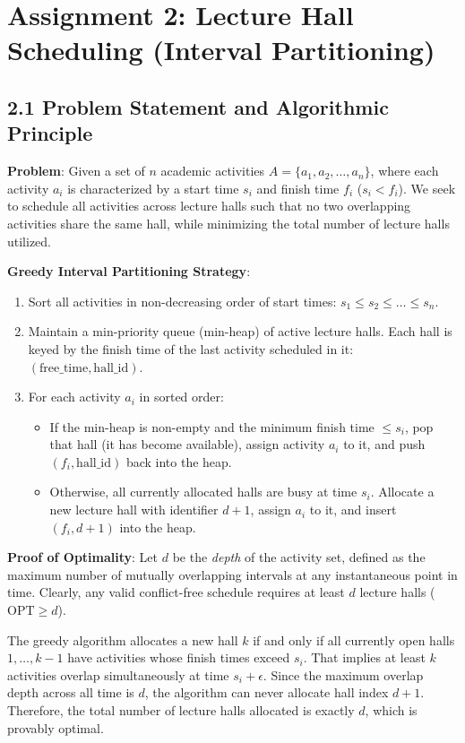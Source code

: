 \documentclass[12pt]{article}
\begin{document}
\section*{Assignment 2: Lecture Hall Scheduling (Interval Partitioning)}

\subsection*{2.1 Problem Statement and Algorithmic Principle}
\textbf{Problem}: Given a set of $n$ academic activities $A = \{a_1, a_2, \dots, a_n\}$, where each activity $a_i$ is characterized by a start time $s_i$ and finish time $f_i$ ($s_i < f_i$). We seek to schedule all activities across lecture halls such that no two overlapping activities share the same hall, while minimizing the total number of lecture halls utilized.

\textbf{Greedy Interval Partitioning Strategy}:
\begin{enumerate}
    \item Sort all activities in non-decreasing order of start times: $s_1 \le s_2 \le \dots \le s_n$.
    \item Maintain a min-priority queue (min-heap) of active lecture halls. Each hall is keyed by the finish time of the last activity scheduled in it: $(\text{free\_time}, \text{hall\_id})$.
    \item For each activity $a_i$ in sorted order:
    \begin{itemize}
        \item If the min-heap is non-empty and the minimum finish time $\le s_i$, pop that hall (it has become available), assign activity $a_i$ to it, and push $(f_i, \text{hall\_id})$ back into the heap.
        \item Otherwise, all currently allocated halls are busy at time $s_i$. Allocate a new lecture hall with identifier $d+1$, assign $a_i$ to it, and insert $(f_i, d+1)$ into the heap.
    \end{itemize}
\end{enumerate}

\textbf{Proof of Optimality}:
Let $d$ be the \textit{depth} of the activity set, defined as the maximum number of mutually overlapping intervals at any instantaneous point in time. Clearly, any valid conflict-free schedule requires at least $d$ lecture halls ($\text{OPT} \ge d$).

The greedy algorithm allocates a new hall $k$ if and only if all currently open halls $1, \dots, k-1$ have activities whose finish times exceed $s_i$. That implies at least $k$ activities overlap simultaneously at time $s_i + \epsilon$. Since the maximum overlap depth across all time is $d$, the algorithm can never allocate hall index $d+1$. Therefore, the total number of lecture halls allocated is exactly $d$, which is provably optimal.
\end{document}

